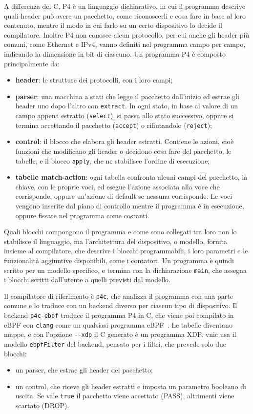 A differenza del C, P4 è un linguaggio dichiarativo, in cui il programma descrive quali header può avere un pacchetto, come riconoscerli e cosa fare in base al loro contenuto, mentre il modo in cui farlo su un certo dispositivo lo decide il compilatore. Inoltre P4 non conosce alcun protocollo, per cui anche gli header più comuni, come Ethernet e IPv4, vanno definiti nel programma campo per campo, indicando la dimensione in bit di ciascuno. Un programma P4 è composto principalmente da:
\begin{itemize}
    \item \textbf{header}: le strutture dei protocolli, con i loro campi;
    \item \textbf{parser}: una macchina a stati che legge il pacchetto dall'inizio ed estrae gli header uno dopo l'altro con \texttt{extract}. In ogni stato, in base al valore di un campo appena estratto (\texttt{select}), si passa allo stato successivo, oppure si termina accettando il pacchetto (\texttt{accept}) o rifiutandolo (\texttt{reject});
    \item \textbf{control}: il blocco che elabora gli header estratti. Contiene le azioni, cioè funzioni che modificano gli header o decidono cosa fare del pacchetto, le tabelle, e il blocco \texttt{apply}, che ne stabilisce l'ordine di esecuzione;
    \item \textbf{tabelle match-action}: ogni tabella confronta alcuni campi del pacchetto, la chiave, con le proprie voci, ed esegue l'azione associata alla voce che corrisponde, oppure un'azione di default se nessuna corrisponde. Le voci vengono inserite dal piano di controllo mentre il programma è in esecuzione, oppure fissate nel programma come costanti.
\end{itemize}

Quali blocchi compongono il programma e come sono collegati tra loro non lo stabilisce il linguaggio, ma l'architettura del dispositivo, o modello, fornita insieme al compilatore, che descrive i blocchi programmabili, i loro parametri e le funzionalità aggiuntive disponibili, come i contatori. Un programma è quindi scritto per un modello specifico, e termina con la dichiarazione \texttt{main}, che assegna i blocchi scritti dall'utente a quelli previsti dal modello.

Il compilatore di riferimento è \texttt{p4c}, che analizza il programma con una parte comune e lo traduce con un backend diverso per ciascun tipo di dispositivo. Il backend \texttt{p4c-ebpf} traduce il programma P4 in C, che viene poi compilato in eBPF con \texttt{clang} come un qualsiasi programma eBPF~\cite{p4c-ebpf}. Le tabelle diventano mappe, e con l'opzione \texttt{-{}-xdp} il C generato è un programma XDP. vnic usa il modello \texttt{ebpfFilter} del backend, pensato per i filtri, che prevede solo due blocchi:
\begin{itemize}
    \item un parser, che estrae gli header del pacchetto;
    \item un control, che riceve gli header estratti e imposta un parametro booleano di uscita. Se vale \texttt{true} il pacchetto viene accettato (PASS), altrimenti viene scartato (DROP).
\end{itemize}

